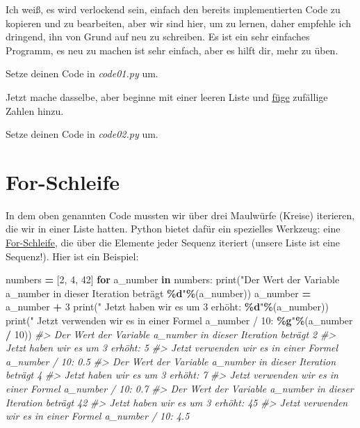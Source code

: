\documentclass[
]{book}
\newenvironment{Shaded}{\begin{snugshade}}{\end{snugshade}}
\newcommand{\BuiltInTok}[1]{#1}
\newcommand{\CommentTok}[1]{\textcolor[rgb]{0.56,0.35,0.01}{\textit{#1}}}
\newcommand{\ControlFlowTok}[1]{\textcolor[rgb]{0.13,0.29,0.53}{\textbf{#1}}}
\newcommand{\DecValTok}[1]{\textcolor[rgb]{0.00,0.00,0.81}{#1}}
\newcommand{\KeywordTok}[1]{\textcolor[rgb]{0.13,0.29,0.53}{\textbf{#1}}}
\newcommand{\NormalTok}[1]{#1}
\newcommand{\OperatorTok}[1]{\textcolor[rgb]{0.81,0.36,0.00}{\textbf{#1}}}
\newcommand{\SpecialCharTok}[1]{\textcolor[rgb]{0.81,0.36,0.00}{\textbf{#1}}}
\newcommand{\StringTok}[1]{\textcolor[rgb]{0.31,0.60,0.02}{#1}}
\begin{document}
Ich weiß, es wird verlockend sein, einfach den bereits implementierten Code zu kopieren und zu bearbeiten, aber wir sind hier, um zu lernen, daher empfehle ich dringend, ihn von Grund auf neu zu schreiben. Es ist ein sehr einfaches Programm, es neu zu machen ist sehr einfach, aber es hilft dir, mehr zu üben.

Setze deinen Code in \emph{code01.py} um.

Jetzt mache dasselbe, aber beginne mit einer leeren Liste und \href{https://docs.python.org/3/tutorial/datastructures.html\#more-on-lists}{füge} zufällige Zahlen hinzu.

Setze deinen Code in \emph{code02.py} um.

\hypertarget{for-loop}{%
\section{For-Schleife}\label{for-loop}}

In dem oben genannten Code mussten wir über drei Maulwürfe (Kreise) iterieren, die wir in einer Liste hatten. Python bietet dafür ein spezielles Werkzeug: eine
\href{https://docs.python.org/3/tutorial/controlflow.html?highlight=loop\#for-statements}{For-Schleife}, die über die Elemente jeder Sequenz iteriert (unsere Liste ist eine Sequenz!). Hier ist ein Beispiel:

\begin{Shaded}
\begin{Highlighting}[]
\NormalTok{numbers }\OperatorTok{=}\NormalTok{ [}\DecValTok{2}\NormalTok{, }\DecValTok{4}\NormalTok{, }\DecValTok{42}\NormalTok{]}
\ControlFlowTok{for}\NormalTok{ a\_number }\KeywordTok{in}\NormalTok{ numbers:}
    \BuiltInTok{print}\NormalTok{(}\StringTok{"Der Wert der Variable a\_number in dieser Iteration beträgt }\SpecialCharTok{\%d}\StringTok{"}\OperatorTok{\%}\NormalTok{(a\_number))}
\NormalTok{    a\_number }\OperatorTok{=}\NormalTok{ a\_number }\OperatorTok{+} \DecValTok{3}
    \BuiltInTok{print}\NormalTok{(}\StringTok{"  Jetzt haben wir es um 3 erhöht: }\SpecialCharTok{\%d}\StringTok{"}\OperatorTok{\%}\NormalTok{(a\_number))}
    \BuiltInTok{print}\NormalTok{(}\StringTok{"  Jetzt verwenden wir es in einer Formel a\_number / 10: }\SpecialCharTok{\%g}\StringTok{"}\OperatorTok{\%}\NormalTok{(a\_number }\OperatorTok{/} \DecValTok{10}\NormalTok{))}
\CommentTok{\#\textgreater{} Der Wert der Variable a\_number in dieser Iteration beträgt 2}
\CommentTok{\#\textgreater{}   Jetzt haben wir es um 3 erhöht: 5}
\CommentTok{\#\textgreater{}   Jetzt verwenden wir es in einer Formel a\_number / 10: 0.5}
\CommentTok{\#\textgreater{} Der Wert der Variable a\_number in dieser Iteration beträgt 4}
\CommentTok{\#\textgreater{}   Jetzt haben wir es um 3 erhöht: 7}
\CommentTok{\#\textgreater{}   Jetzt verwenden wir es in einer Formel a\_number / 10: 0.7}
\CommentTok{\#\textgreater{} Der Wert der Variable a\_number in dieser Iteration beträgt 42}
\CommentTok{\#\textgreater{}   Jetzt haben wir es um 3 erhöht: 45}
\CommentTok{\#\textgreater{}   Jetzt verwenden wir es in einer Formel a\_number / 10: 4.5}
\end{Highlighting}
\end{Shaded}
\end{document}
